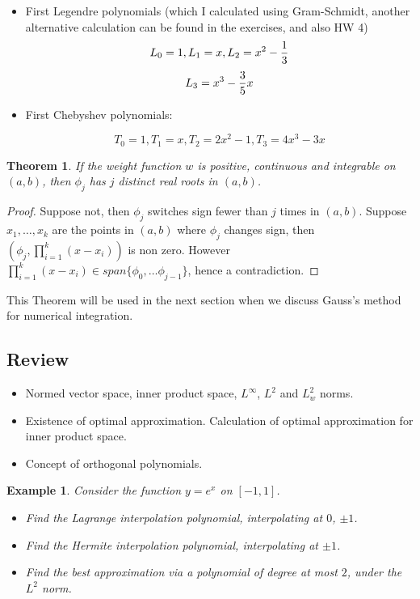 \documentclass{article} %
\theoremstyle{break}
\newtheorem{exa}[definition]{Example}
\newtheorem{thm}[definition]{Theorem}
\begin{document}
\begin{itemize}
\item First Legendre polynomials (which I calculated using Gram-Schmidt, another alternative calculation can be found in the exercises, and also HW 4)
  \[L_0=1, L_1=x, L_2=x^2-{1\over 3}\]
  \[L_3=x^3-{3\over 5}x\]

\item First Chebyshev polynomials:

  \[T_0=1, T_1=x, T_2=2x^2-1, T_3=4x^3-3x\]

\end{itemize}





\begin{thm}\label{orth_roots}
  If the weight function $w$ is positive, continuous and integrable on $(a, b)$, then $\phi_j$ has $j$ distinct real roots in $(a, b)$. 
\end{thm}
\begin{proof}
Suppose not, then $\phi_j$ switches sign fewer than $j$ times in $(a, b)$. Suppose $x_1, \dots, x_k$ are the points in $(a, b)$ where $\phi_j$ changes sign, then $(\phi_j, \prod_{i=1}^k(x-x_i))$ is non zero. However $\prod_{i=1}^k(x-x_i)\in span\{\phi_0, \dots \phi_{j-1}\}$, hence a contradiction.
\end{proof}

This Theorem will be used in the next section when we discuss Gauss's method for numerical integration.

\subsection{Review}

\begin{itemize}
\item Normed vector space, inner product space, $L^\infty$, $L^2$ and $L^2_w$ norms.
\item Existence of optimal approximation. Calculation of optimal approximation for inner product space.
\item Concept of orthogonal polynomials.
\end{itemize}


\begin{exa} Consider the function $y=e^x$ on $[-1, 1]$.
  \begin{itemize}
  \item Find the Lagrange interpolation polynomial, interpolating at $0$, $\pm 1$.
  \item Find the Hermite interpolation polynomial, interpolating at $\pm 1$.
  \item Find the best approximation via a polynomial of degree at most $2$, under the $L^2$ norm.
  \end{itemize}
\end{exa}
\end{document}
